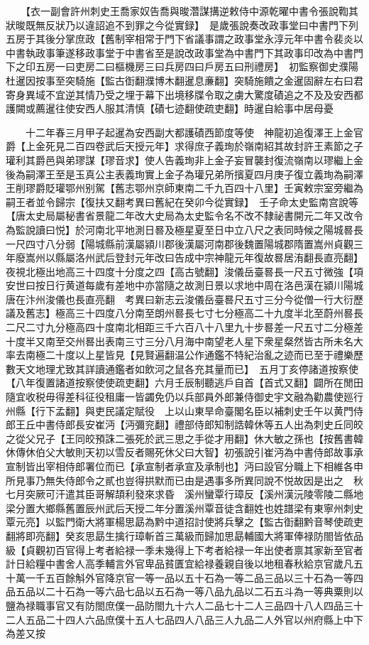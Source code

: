　　【衣一副會許州刺史王喬家奴告喬與晙濳謀搆逆敕侍中源乾曜中書令張說鞫其狀晙既無反狀乃以違詔追不到罪之今從實録】　是歲張說奏改政事堂曰中書門下列五房于其後分掌庶政【舊制宰相常于門下省議事謂之政事堂永淳元年中書令裴炎以中書執政事筆遂移政事堂于中書省至是說改政事堂為中書門下其政事印改為中書門下之印五房一曰吏房二曰樞機房三曰兵房四曰戶房五曰刑禮房】　初監察御史濮陽杜暹因按事至突騎施【監古衘翻濮博木翻暹息亷翻】突騎施饋之金暹固辭左右曰君寄身異域不宜逆其情乃受之埋于幕下出境移牒令取之虜大驚度磧追之不及及安西都護闕或薦暹往使安西人服其清慎【磧七迹翻使疏吏翻】時暹自給事中居母憂

　　十二年春三月甲子起暹為安西副大都護磧西節度等使　神龍初追復澤王上金官爵【上金死見二百四卷武后天授元年】求得庶子義珣於嶺南紹其故封許王素節之子瓘利其爵邑與弟璆謀【璆音求】使人告義珣非上金子妄冒襲封復流嶺南以璆繼上金後為嗣澤王至是玉真公主表義珣實上金子為瓘兄弟所擯夏四月庚子復立義珣為嗣澤王削璆爵貶瓘鄂州别駕【舊志鄂州京師東南二千九百四十八里】壬寅敕宗室旁繼為嗣王者並令歸宗【復扶又翻考異曰舊紀在癸卯今從實録】　壬子命太史監南宫說等【唐太史局屬秘書省景龍二年改大史局為太史監令名不改不隸祕書開元二年又改令為監說讀曰悦】於河南北平地測日晷及極星夏至日中立八尺之表同時候之陽城晷長一尺四寸八分弱【陽城縣前漢屬潁川郡後漢屬河南郡後魏置陽城郡隋置嵩州貞觀三年廢嵩州以縣屬洛州武后登封元年改曰告成中宗神龍元年復故晷居洧翻長直亮翻】夜視北極出地高三十四度十分度之四【高古號翻】浚儀岳臺晷長一尺五寸微強【項安世曰按日行黄道每歲有差地中亦當隨之故測日景以求地中周在洛邑漢在潁川陽城唐在汴州浚儀也長直亮翻　考異曰新志云浚儀岳臺晷尺五寸三分今從僧一行大衍歷議及舊志】極高三十四度八分南至朗州晷長七寸七分極高二十九度半北至蔚州晷長二尺二寸九分極高四十度南北相距三千六百八十八里九十步晷差一尺五寸二分極差十度半又南至交州晷出表南三寸三分八月海中南望老人星下衆星粲然皆古所未名大率去南極二十度以上星皆見【見賢遍翻温公作通鑑不特紀治亂之迹而已至于禮樂歷數天文地理尤致其詳讀通鑑者如飲河之鼠各充其量而已】　五月丁亥停諸道按察使【八年復置諸道按察使使疏吏翻】六月壬辰制聽逃戶自首【首式又翻】闢所在閒田隨宜收税毋得差科征役租庸一皆蠲免仍以兵部員外郎兼侍御史宇文融為勸農使廵行州縣【行下孟翻】與吏民議定賦役　上以山東旱命臺閣名臣以補刺史壬午以黄門侍郎王丘中書侍郎長安崔沔【沔彌兖翻】禮部侍郎知制誥韓休等五人出為刺史丘同皎之從父兄子【王同皎預誅二張死於武三思之手從才用翻】休大敏之孫也【按舊書韓休傳休伯父大敏則天初以雪反者賜死休父曰大智】初張說引崔沔為中書侍郎故事承宣制皆出宰相侍郎署位而已【承宣制者承宣及承制也】沔曰設官分職上下相維各申所見事乃無失侍郎令之貳也豈得拱默而已由是遇事多所異同說不悦故因是出之　秋七月突厥可汗遣其臣哥解頡利發來求昏　溪州蠻覃行璋反【溪州漢沅陵零陵二縣地梁分置大鄉縣舊置辰州武后天授二年分置溪州覃音徒含翻姓也姓譜梁有東寧州刺史覃元亮】以監門衛大將軍楊思勗為黔中道招討使將兵擊之【監古衘翻黔音琴使疏吏翻將即亮翻】癸亥思勗生擒行璋斬首三萬級而歸加思勗輔國大將軍俸禄防閤皆依品級【貞觀初百官得上考者給禄一季未幾得上下考者給禄一年出使者禀其家新至官者計日給糧中書舍人高季輔言外官卑品貧匱宜給禄養親自後以地租春秋給京官歲凡五十萬一千五百餘斛外官降京官一等一品以五十石為一等二品三品以三十石為一等四品五品以二十石為一等六品七品以五石為一等八品九品以二石五斗為一等典粟則以鹽為禄職事官又有防閤庶僕一品防閤九十六人二品七十二人三品四十八人四品三十二人五品二十四人六品庶僕十五人七品四人八品三人九品二人外官以州府縣上中下為差又按